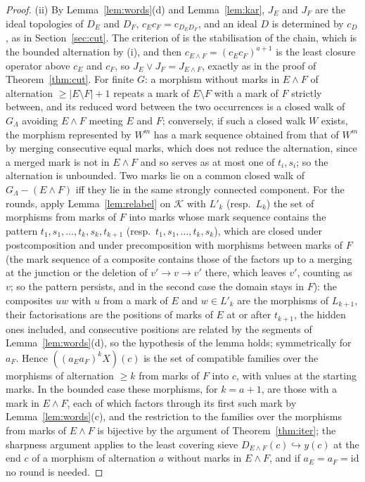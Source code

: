 \documentclass[11pt]{amsart}
\theoremstyle{definition}
\begin{document}
\begin{proof}
(ii) By Lemma~\ref{lem:words}(d) and Lemma~\ref{lem:kar}, $J_E$ and
$J_F$ are the ideal topologies of $D_E$ and $D_F$, $c_Ec_F=c_{D_ED_F}$,
and an ideal $D$ is determined by $c_D$, as in Section~\ref{sec:cut}. The
criterion of \cite[Thm.~B]{Fijoin} is the stabilisation of the chain,
which is the bounded alternation by (i), and then $c_{E\wedge F}=
(c_Ec_F)^{a+1}$ is the least closure operator above $c_E$ and $c_F$,
so $J_E\vee J_F=J_{E\wedge F}$, exactly as in the proof of
Theorem~\ref{thm:cut}. For finite $G$: a morphism without marks in
$E\wedge F$ of alternation $\ge|E\setminus F|+1$ repeats a mark of
$E\setminus F$ with a mark of $F$ strictly between, and its reduced word
between the two occurrences is a closed walk of $G_\Lambda$ avoiding
$E\wedge F$ meeting $E$ and $F$; conversely, if such a closed walk $W$
exists, the morphism represented by $W^m$ has a mark sequence obtained
from that of $W^m$ by merging consecutive equal marks, which does not
reduce the alternation, since a merged mark is not in $E\wedge F$ and
so serves as at most one of $t_i,s_i$; so the alternation is unbounded.
Two marks lie on a common closed walk of $G_\Lambda-(E\wedge F)$ iff
they lie in the same strongly connected component. For the rounds,
apply Lemma~\ref{lem:relabel} on $\mathcal K$ with $L'_k$ (resp.\
$L_k$) the set of morphisms from marks of $F$ into marks whose mark
sequence contains the pattern $t_1,s_1,\dots,t_k,s_k,t_{k+1}$ (resp.\
$t_1,s_1,\dots,t_k,s_k$), which are closed under postcomposition and
under precomposition with morphisms between marks of $F$ (the mark
sequence of a composite contains those of the factors up to a merging
at the junction or the deletion of $v'\to v\to v'$ there, which leaves
$v'$, counting as $v$; so the pattern persists, and in the second case
the domain stays in $F$): the
composites $uw$ with $u$ from a mark of $E$ and $w\in L'_k$ are the
morphisms of $L_{k+1}$, their factorisations are the positions of marks
of $E$ at or after $t_{k+1}$, the hidden ones included, and consecutive
positions are related by the segments of Lemma~\ref{lem:words}(d), so
the hypothesis of the lemma holds; symmetrically for $a_F$. Hence
$((a_Ea_F)^kX)(c)$ is the set of compatible families over the morphisms
of alternation $\ge k$ from marks of $F$ into $c$, with values at the
starting marks. In the
bounded case these morphisms, for $k=a+1$, are those with a mark in
$E\wedge F$, each of which factors through its first such mark by
Lemma~\ref{lem:words}(c), and the restriction to the families over the
morphisms from marks of $E\wedge F$ is bijective by the argument of
Theorem~\ref{thm:iter}; the sharpness argument applies to the least
covering sieve $D_{E\wedge F}(c)\hookrightarrow y(c)$ at the end $c$ of
a morphism of alternation $a$ without marks in $E\wedge F$, and if
$a_E=a_F=\mathrm{id}$ no round is needed.


\end{proof}
\end{document}
